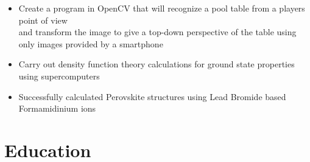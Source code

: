 \documentclass{Custom_CV}
\begin{document}
\begin{itemize}[rightmargin=\dimexpr\linewidth-15cm-\leftmargin\relax,noitemsep]
\item Create a program in OpenCV that will recognize a pool table from a players point of view\\
and transform the image to give a top-down perspective of the table using only images provided by a smartphone
\end{itemize}

\begin{itemize}[rightmargin=\dimexpr\linewidth-15cm-\leftmargin\relax,noitemsep]
\item Carry out density function theory calculations for ground state properties using supercomputers
\item Successfully calculated Perovskite structures using Lead Bromide based Formamidinium ions
\end{itemize}

\section{Education}





\end{document}
